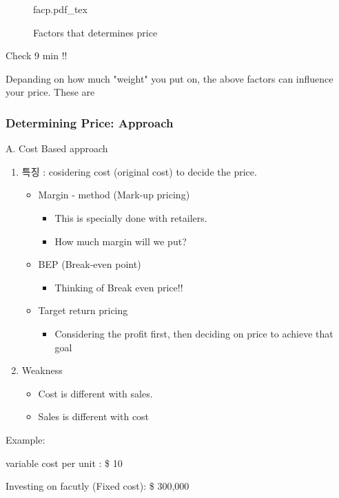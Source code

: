 \documentclass[12pt]{article}
\begin{document}
\begin{itemize}
\begin{figure}[H]
	\centering
	\def\svgwidth{\columnwidth}
	{facp.pdf_tex}
	\caption{Factors that determines price}
	\label{fig:facp}
\end{figure}

Check 9 min !!

Depanding on how much "weight" you put on, the above factors can influence your price. These are

\subsubsection{Determining Price: Approach}

A. Cost Based approach
\begin{enumerate}
	\item 특징 : cosidering cost (original cost) to decide the price.
	\begin{itemize}
		\item Margin - method (Mark-up pricing)
		\begin{itemize}
			\item This is specially done with retailers.
			\item How much margin will we put?
		\end{itemize}
		\item BEP (Break-even point)
		\begin{itemize}
			\item Thinking of Break even price!!
		\end{itemize}
		\item Target return pricing
		\begin{itemize}
			\item Considering the profit first, then deciding on price to achieve that goal
		\end{itemize}
	\end{itemize}

	\item Weakness
	\begin{itemize}
		\item Cost is different with sales.
		\item Sales is different with cost
	\end{itemize}
\end{enumerate}

Example:
\begin{tcolorbox}
	variable cost per unit : \$ 10

	Investing on facutly (Fixed cost): \$ 300,000


\end{tcolorbox}
\end{itemize}
\end{document}
